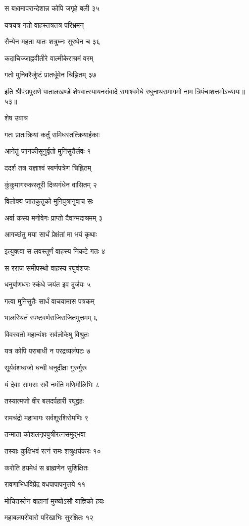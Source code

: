 स बभ्रामापरान्देशान्न कोपि जगृहे बली ३५

यत्रयत्र गतो वाहस्तत्रतत्र परिभ्रमन्

सैन्येन महता यातः शत्रुघ्नः सुरथेन च ३६

कदाचिज्जाह्नवीतीरे वाल्मीकेराश्रमं वरम्

गतो मुनिवरैर्जुष्टं प्रातर्धूमेन चिह्नितम् ३७

इति श्रीपद्मपुराणे पातालखण्डे शेषवात्स्यायनसंवादे रामाश्वमेधे रघुनाथसमागमो नाम त्रिपंचाशत्तमोऽध्यायः॥५३॥


शेष उवाच

गतः प्रातःक्रियां कर्तुं समिधस्तत्क्रियार्हकाः

आनेतुं जानकीसूनुर्वृतो मुनिसुतैर्लवः १

ददर्श तत्र यज्ञाश्वं स्वर्णपत्रेण चिह्नितम्

कुंकुमागरुकस्तूरी दिव्यगंधेन वासितम् २

विलोक्य जातकुतुको मुनिपुत्रानुवाच सः

अर्वा कस्य मनोवेगः प्राप्तो दैवान्मदाश्रमम् ३

आगच्छंतु मया सार्धं प्रेक्षंतां मा भयं कृथाः

इत्युक्त्वा स लवस्तूर्णं वाहस्य निकटे गतः ४

स रराज समीपस्थो वाहस्य रघुवंशजः

धनुर्बाणधरः स्कंधे जयंत इव दुर्जयः ५

गत्वा मुनिसुतैः सार्धं वाचयामास पत्रकम्

भालस्थितं स्पष्टवर्णराजिराजितमुत्तमम् ६

विवस्वतो महान्वंशः सर्वलोकेषु विश्रुतः

यत्र कोपि पराबाधी न परद्रव्यलंपटः ७

सूर्यवंशध्वजो धन्वी धनुर्दीक्षा गुरुर्गुरुः

यं देवाः सामराः सर्वे नमंति मणिमौलिभिः ८

तस्यात्मजो वीर बलदर्पहारी रघूद्वहः

रामचंद्रो महाभागः सर्वशूरशिरोमणिः ९

तन्माता कोशलनृपपुत्रीरत्नसमुद्भवा

तस्याः कुक्षिभवं रत्नं रामः शत्रुक्षयंकरः १०

करोति हयमेधं स ब्राह्मणेन सुशिक्षितः

रावणाभिधविप्रेंद्र वधपापापनुत्तये ११

मोचितस्तेन वाहानां मुख्योऽसौ याज्ञिको हयः

महाबलपरीवारो परिखाभिः सुरक्षितः १२

